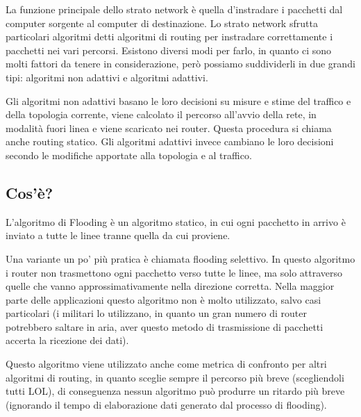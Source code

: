 La funzione principale dello strato network è quella d'instradare i pacchetti dal computer sorgente al computer di destinazione.
Lo strato network sfrutta particolari algoritmi detti algoritmi di routing per instradare correttamente i pacchetti nei vari percorsi. Esistono diversi modi per farlo, in quanto ci sono molti fattori da tenere in considerazione, però possiamo suddividerli in due grandi tipi: algoritmi non adattivi e algoritmi adattivi.

Gli algoritmi non adattivi basano le loro decisioni su misure e stime del traffico e della topologia corrente, viene calcolato il percorso all'avvio della rete, in modalità fuori linea e viene scaricato nei router. Questa procedura si chiama anche routing statico. Gli algoritmi adattivi invece cambiano le loro decisioni secondo le modifiche apportate alla topologia e al traffico.
\subsection{Cos'è?}
L'algoritmo di Flooding è un algoritmo statico, in cui ogni pacchetto in arrivo è inviato a tutte le linee tranne quella da cui proviene.

Una variante un po' più pratica è chiamata flooding selettivo. In questo algoritmo i router non trasmettono ogni pacchetto verso tutte le linee, ma solo attraverso quelle che vanno approssimativamente nella direzione corretta.
Nella maggior parte delle applicazioni questo algoritmo non è molto utilizzato, salvo casi particolari (i militari lo utilizzano, in quanto un gran numero di router potrebbero saltare in aria, aver questo metodo di trasmissione di pacchetti accerta la ricezione dei dati).

Questo algoritmo viene utilizzato anche come metrica di confronto per altri algoritmi di routing, in quanto sceglie sempre il percorso più breve (scegliendoli tutti LOL), di conseguenza nessun algoritmo può produrre un ritardo più breve (ignorando il tempo di elaborazione dati generato dal processo di flooding).

